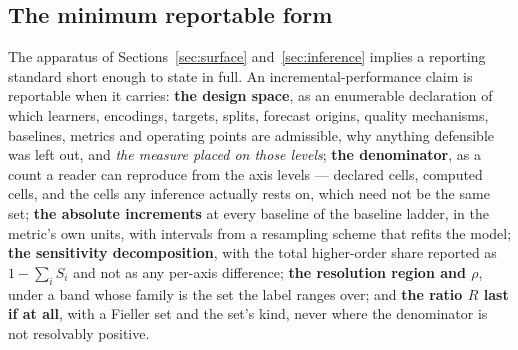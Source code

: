 
\subsection{The minimum reportable form}

The apparatus of Sections~\ref{sec:surface} and~\ref{sec:inference} implies a
reporting standard short enough to state in full. An incremental-performance claim is
reportable when it carries: \textbf{the design space}, as an enumerable
declaration of which learners, encodings, targets, splits, forecast origins,
quality mechanisms, baselines, metrics and operating points are admissible,
why anything defensible was left out, and \emph{the measure placed on those
levels}; \textbf{the denominator}, as a count a reader can reproduce from the
axis levels --- declared cells, computed cells, and the cells any inference
actually rests on, which need not be the same set; \textbf{the absolute
increments} at every baseline of the baseline ladder, in the metric's own units,
with intervals from a resampling scheme that refits the model; \textbf{the
sensitivity decomposition}, with the total higher-order share reported as
$1 - \sum_i S_i$ and not as any per-axis difference; \textbf{the resolution
region and $\rho$}, under a band whose family is the set the label ranges
over; and \textbf{the ratio $R$ last if at all}, with a Fieller set and the
set's kind, never where the denominator is not resolvably positive.

